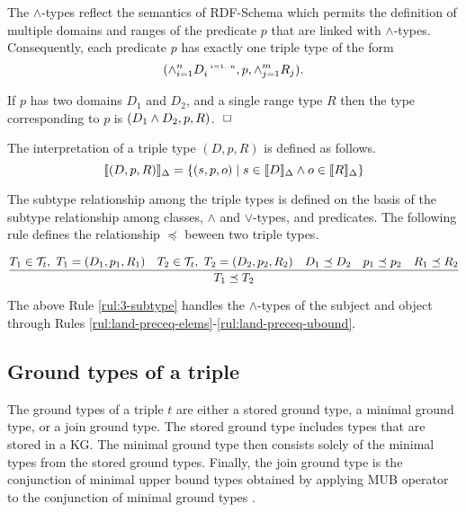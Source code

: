 \documentclass[runningheads]{llncs}
\newcommand{\s}{\scriptscriptstyle\ \,}
\newcommand{\llb}{\llbracket}
\newcommand{\rrb}{\rrbracket}
\newcommand{\T}{{\cal T}}
\newcommand{\finbox}{\phantom{.}\hfill\Box}
\begin{document}
The $\land$-types reflect the semantics of RDF-Schema \cite{rdfschema}
which permits the definition of multiple domains and ranges of the
predicate $p$ that are linked with $\land$-types. Consequently, each
predicate $p$ has exactly one triple type of the form
$$(\land_{i=1}^n\/D_i^{\s\/i=1..n}, p ,\land_{j=1}^m\/R_j).$$

\begin{example}
  If $p$ has two domains $D_1$ and $D_2$, and a single
range type $R$ then the type corresponding to $p$ is
$(D_1\land\/D_2,p,R)$. $\finbox$
\end{example}

\noindent
The interpretation of a triple type $(D,p,R)$ is defined as
follows.
$$\llb(D,p,R)\rrb_\Delta=\{(s,p,o)\mid\/s\in\llb\/D\rrb_\Delta\land\/o\in\llb\/R\rrb_\Delta \}$$

The subtype relationship among the triple types is defined on the
basis of the subtype relationship among classes, $\land$ and
$\lor$-types, and predicates. The following rule defines the
relationship $\preceq$ beween two triple types.

\begin{equation}
\label{rul:3-subtype}
\dfrac{T_1\in\T_t,\ T_1=(D_1,p_1,R_1)\quad T_2\in\T_t,\ T_2=(D_2,p_2,R_2)\quad\/D_1\preceq\/D_2\quad\/p_1\preceq\/p_2\quad\/R_1\preceq\/R_2}
      {T_1\preceq\/T_2}
\end{equation}

\noindent
The above Rule \ref{rul:3-subtype} handles the $\land$-types of the
subject and object through Rules
\ref{rul:land-preceq-elems}-\ref{rul:land-preceq-ubound}.







\subsection{Ground types of a triple\label{sec:3-ground-types}}

\noindent
The ground types of a triple $t$ are either a stored ground type, a
minimal ground type, or a join ground type. The stored ground type
includes types that are stored in a KG. The minimal ground type then
consists solely of the minimal types from the stored ground
types. Finally, the join ground type is the conjunction of minimal
upper bound types obtained by applying MUB operator to the conjunction
of minimal ground types \cite{Knudstorp2024}.
 
\end{document}
